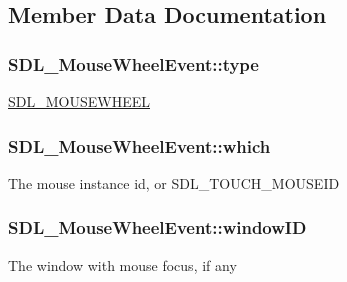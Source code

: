 \subsection{Member Data Documentation}
\hypertarget{struct_s_d_l___mouse_wheel_event_aa6b741e99df708c6f9550ee0f520fb70}{}
\subsubsection[{type}]{ S\+D\+L\+\_\+\+Mouse\+Wheel\+Event\+::type}\label{struct_s_d_l___mouse_wheel_event_aa6b741e99df708c6f9550ee0f520fb70}
\hyperlink{_s_d_l__events_8h_a3b589e89be6b35c02e0dd34a55f3fccaa63135c2e0aea2286f05066f3c0bc5c4e}{S\+D\+L\+\_\+\+M\+O\+U\+S\+E\+W\+H\+E\+E\+L} \hypertarget{struct_s_d_l___mouse_wheel_event_a014dc767d52e8b75ba26a5f12e1704e8}{}
\subsubsection[{which}]{ S\+D\+L\+\_\+\+Mouse\+Wheel\+Event\+::which}\label{struct_s_d_l___mouse_wheel_event_a014dc767d52e8b75ba26a5f12e1704e8}
The mouse instance id, or S\+D\+L\+\_\+\+T\+O\+U\+C\+H\+\_\+\+M\+O\+U\+S\+E\+I\+D \hypertarget{struct_s_d_l___mouse_wheel_event_ab45eb1895217214ecb773fc555e08f6c}{}
\subsubsection[{window\+I\+D}]{ S\+D\+L\+\_\+\+Mouse\+Wheel\+Event\+::window\+I\+D}\label{struct_s_d_l___mouse_wheel_event_ab45eb1895217214ecb773fc555e08f6c}
The window with mouse focus, if any \hypertarget{struct_s_d_l___mouse_wheel_event_a6d904eef474ea45a5b1828fcb5b0f859}{}
